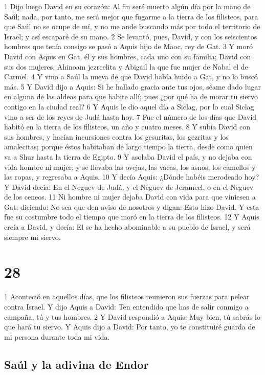 {1 Dijo luego David en su corazón: Al fin seré muerto algún día por la mano de Saúl; nada, por tanto, me será mejor que fugarme a la tierra de los filisteos, para que Saúl no se ocupe de mí, y no me ande buscando más por todo el territorio de Israel; y así escaparé de su mano.
2 Se levantó, pues, David, y con los seiscientos hombres que tenía consigo se pasó a Aquis hijo de Maoc, rey de Gat.
3 Y moró David con Aquis en Gat, él y sus hombres, cada uno con su familia; David con sus dos mujeres, Ahinoam jezreelita y Abigail la que fue mujer de Nabal el de Carmel.
4 Y vino a Saúl la nueva de que David había huido a Gat, y no lo buscó más.
5 Y David dijo a Aquis: Si he hallado gracia ante tus ojos, séame dado lugar en alguna de las aldeas para que habite allí; pues ¿por qué ha de morar tu siervo contigo en la ciudad real?
6 Y Aquis le dio aquel día a Siclag, por lo cual Siclag vino a ser de los reyes de Judá hasta hoy.
7 Fue el número de los días que David habitó en la tierra de los filisteos, un año y cuatro meses.
8 Y subía David con sus hombres, y hacían incursiones contra los gesuritas, los gezritas y los amalecitas; porque éstos habitaban de largo tiempo la tierra, desde como quien va a Shur hasta la tierra de Egipto.
9 Y asolaba David el país, y no dejaba con vida hombre ni mujer; y se llevaba las ovejas, las vacas, los asnos, los camellos y las ropas, y regresaba a Aquis.
10 Y decía Aquis: ¿Dónde habéis merodeado hoy? Y David decía: En el Neguev de Judá, y el Neguev de Jerameel, o en el Neguev de los ceneos.
11 Ni hombre ni mujer dejaba David con vida para que viniesen a Gat; diciendo: No sea que den aviso de nosotros y digan: Esto hizo David. Y esta fue su costumbre todo el tiempo que moró en la tierra de los filisteos.
12 Y Aquis creía a David, y decía: El se ha hecho abominable a su pueblo de Israel, y será siempre mi siervo.

\chapter{28}


1 Aconteció en aquellos días, que los filisteos reunieron sus fuerzas para pelear contra Israel. Y dijo Aquis a David: Ten entendido que has de salir conmigo a campaña, tú y tus hombres.
2 Y David respondió a Aquis: Muy bien, tú sabrás lo que hará tu siervo. Y Aquis dijo a David: Por tanto, yo te constituiré guarda de mi persona durante toda mi vida.

\section*{Saúl y la adivina de Endor}

}

